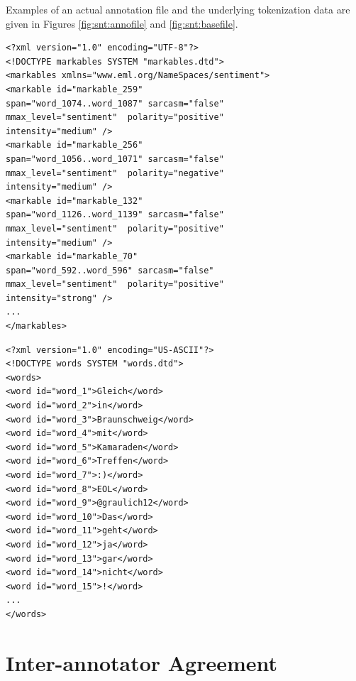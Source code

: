 Examples of an actual annotation file and the underlying tokenization
data are given in Figures \ref{fig:snt:annofile} and
\ref{fig:snt:basefile}.

\begin{minipage}[t]{\textwidth}
  \begin{minipage}[t]{0.45\textwidth}
    \lstset{language=XML}
    \begin{lstlisting}
<?xml version="1.0" encoding="UTF-8"?>
<!DOCTYPE markables SYSTEM "markables.dtd">
<markables xmlns="www.eml.org/NameSpaces/sentiment">
<markable id="markable_259"
span="word_1074..word_1087" sarcasm="false"
mmax_level="sentiment"  polarity="positive"
intensity="medium" />
<markable id="markable_256"
span="word_1056..word_1071" sarcasm="false"
mmax_level="sentiment"  polarity="negative"
intensity="medium" />
<markable id="markable_132"
span="word_1126..word_1139" sarcasm="false"
mmax_level="sentiment"  polarity="positive"
intensity="medium" />
<markable id="markable_70"
span="word_592..word_596" sarcasm="false"
mmax_level="sentiment"  polarity="positive"
intensity="strong" />
...
</markables>
    \end{lstlisting}%
  \end{minipage}\hfill%
  \begin{minipage}[t]{0.45\textwidth}%
    \lstset{language=XML}
    \begin{lstlisting}[basicstyle=\tiny]
<?xml version="1.0" encoding="US-ASCII"?>
<!DOCTYPE words SYSTEM "words.dtd">
<words>
<word id="word_1">Gleich</word>
<word id="word_2">in</word>
<word id="word_3">Braunschweig</word>
<word id="word_4">mit</word>
<word id="word_5">Kamaraden</word>
<word id="word_6">Treffen</word>
<word id="word_7">:)</word>
<word id="word_8">EOL</word>
<word id="word_9">@graulich12</word>
<word id="word_10">Das</word>
<word id="word_11">geht</word>
<word id="word_12">ja</word>
<word id="word_13">gar</word>
<word id="word_14">nicht</word>
<word id="word_15">!</word>
...
</words>
    \end{lstlisting}%
  \end{minipage}
\end{minipage}

\section{Inter-annotator Agreement}\label{subsec:snt:iaa}

